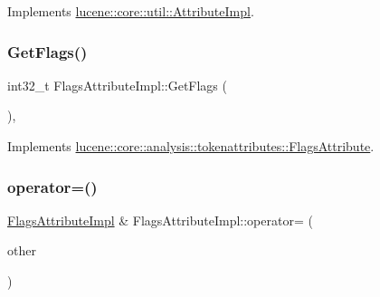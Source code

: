 Implements \mbox{\hyperlink{classlucene_1_1core_1_1util_1_1AttributeImpl_a135318ad4c7c17b3d85e625e32fb42cd}{lucene\+::core\+::util\+::\+Attribute\+Impl}}.

\mbox{\label{classlucene_1_1core_1_1analysis_1_1tokenattributes_1_1FlagsAttributeImpl_aa3fb651752273e55f85419ef522eaa3e}} 
\subsubsection{\texorpdfstring{Get\+Flags()}{GetFlags()}}
{\footnotesize\ttfamily int32\+\_\+t Flags\+Attribute\+Impl\+::\+Get\+Flags (\begin{DoxyParamCaption}{ }\end{DoxyParamCaption})\hspace{0.3cm}{\ttfamily [override]}, {\ttfamily [virtual]}}



Implements \mbox{\hyperlink{classlucene_1_1core_1_1analysis_1_1tokenattributes_1_1FlagsAttribute_af5e017643df32ab110aca8337c01006d}{lucene\+::core\+::analysis\+::tokenattributes\+::\+Flags\+Attribute}}.

\mbox{\label{classlucene_1_1core_1_1analysis_1_1tokenattributes_1_1FlagsAttributeImpl_a41dfb20fafc327e7832e639695b453fa}} 
\subsubsection{\texorpdfstring{operator=()}{operator=()}\hspace{0.1cm}{\footnotesize\ttfamily [1/2]}}
{\footnotesize\ttfamily \mbox{\hyperlink{classlucene_1_1core_1_1analysis_1_1tokenattributes_1_1FlagsAttributeImpl}{Flags\+Attribute\+Impl}} \& Flags\+Attribute\+Impl\+::operator= (\begin{DoxyParamCaption}\item[{\mbox{\hyperlink{ZlibCrc32_8h_a2c212835823e3c54a8ab6d95c652660e}{const}} \mbox{\hyperlink{classlucene_1_1core_1_1util_1_1AttributeImpl}{lucene\+::core\+::util\+::\+Attribute\+Impl}} \&}]{other }\end{DoxyParamCaption})\hspace{0.3cm}{\ttfamily [virtual]}}



